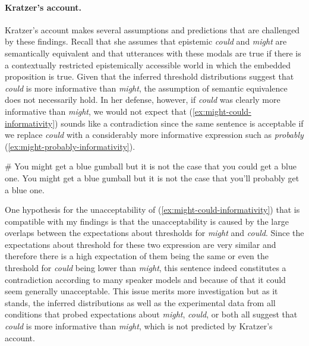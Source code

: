 \paragraph{Kratzer's account.} Kratzer's account makes several assumptions and predictions that are challenged by these findings. Recall that she assumes that epistemic \textit{could} and
\textit{might} are semantically equivalent and that utterances with these modals are true if there is a contextually restricted epistemically accessible
world in which the embedded proposition is true. Given that the inferred threshold distributions suggest that \textit{could} is more informative than \textit{might},
the assumption of semantic equivalence does not necessarily hold. In her defense, however, if \textit{could} was clearly more informative than \textit{might},
we would not expect that (\ref{ex:might-could-informativity}) sounds like a contradiction since the same sentence is acceptable if we replace \textit{could} with
a considerably more informative expression such as \textit{probably} (\ref{ex:might-probably-informativity}).


\begin{exe}
\ex \label{ex:might-could-informativity} \# You might get a blue gumball but it is not the case that you could get a blue one.
\ex \label{ex:might-probably-informativity} You might get a blue gumball but it is not the case that you'll probably get a blue one.
\end{exe}

\noindent One hypothesis for the unacceptability of (\ref{ex:might-could-informativity}) that is compatible with my findings is
that the unacceptability is caused by the large overlaps between the expectations about thresholds for \textit{might} and \textit{could}. 
Since the expectations about threshold for these two expression are very similar and therefore there is a 
high expectation of them being the same or even the threshold for \textit{could} being lower than \textit{might}, this sentence
indeed constitutes a contradiction according to many speaker models and  because of that it could seem generally unacceptable.
This issue merits more investigation but as it stands,  the inferred distributions as well as the experimental data from all conditions
that probed expectations about \textit{might}, \textit{could}, or both all suggest that \textit{could} is more informative than \textit{might}, which is not
predicted by Kratzer's account.

